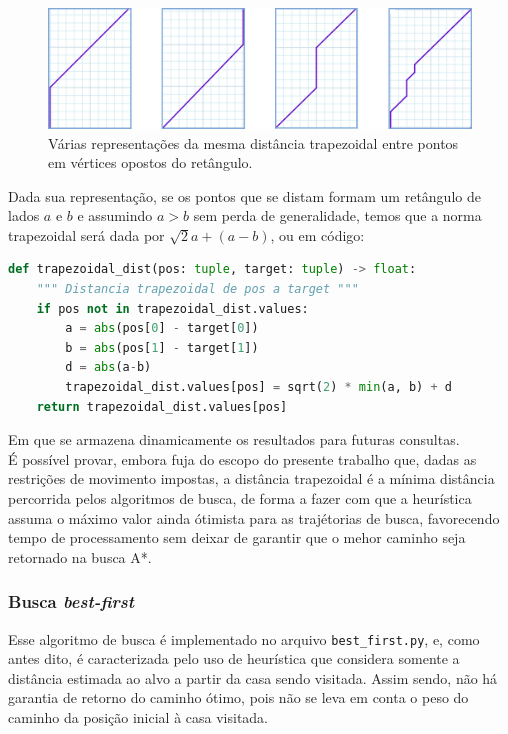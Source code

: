 \documentclass[12pt]{article}
\begin{document}
\begin{figure}[h!]
	\centering
	\label{fig:trapezoidal}
	\includegraphics[width=.9\textwidth]{trapezoidal}
	\caption{Várias representações da mesma distância trapezoidal entre pontos em vértices opostos do retângulo.}
\end{figure}

Dada sua representação, se os pontos que se distam formam um retângulo de lados \(a\) e \(b\) e assumindo \(a\gt b\) sem perda de generalidade, temos que a norma trapezoidal será dada por \(\sqrt{2}a + (a - b)\), ou em código:\\

\begin{lstlisting}[language=Python]
def trapezoidal_dist(pos: tuple, target: tuple) -> float:
    """ Distancia trapezoidal de pos a target """
    if pos not in trapezoidal_dist.values:
        a = abs(pos[0] - target[0])
        b = abs(pos[1] - target[1])
        d = abs(a-b)
        trapezoidal_dist.values[pos] = sqrt(2) * min(a, b) + d
    return trapezoidal_dist.values[pos]
\end{lstlisting}

Em que se armazena dinamicamente os resultados para futuras consultas.\\

É possível provar, embora fuja do escopo do presente trabalho que, dadas as restrições de movimento impostas, a distância trapezoidal é a mínima distância percorrida pelos algoritmos de busca, de forma a fazer com que a heurística assuma o máximo valor ainda ótimista para as trajétorias de busca, favorecendo tempo de processamento sem deixar de garantir que o mehor caminho seja retornado na busca A*.

\subsubsection{Busca \emph{best-first}}

Esse algoritmo de busca é implementado no arquivo \verb|best_first.py|, e, como antes dito, é caracterizada pelo uso de heurística que considera somente a distância estimada ao alvo a partir da casa sendo visitada. Assim sendo, não há garantia de retorno do caminho ótimo, pois não se leva em conta o peso do caminho da posição inicial à casa visitada.\\
\end{document}
